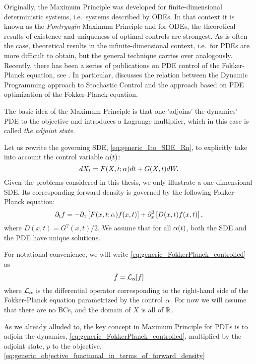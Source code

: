 Originally, the Maximum Principle was developed for finite-dimensional
deterministic systems, i.e.\ systems described by ODEs. In that context it is
known as the {\sl Pontryagin} Maximum Principle and for ODEs, the theoretical
results of existence and uniqueness of optimal controls are strongest. 
As is often the case, theoretical results in the infinite-dimensional context,
i.e.\ for PDEs are more difficult to obtain, but the general technique carries
over analogously. Recently, there has been a series of publications on PDE
control of the Fokker-Planck equation, see \cite{Annunziato2010,Annunziato2013,Annunziato2014}.
In particular, \cite{Annunziato2014} discusses the relation between the Dynamic
Programming approach to Stochastic Control and the approach based on PDE
optimization of the Fokker-Planck equation.

The basic idea of the Maximum Principle is that one 'adjoins' the dynamics' PDE
to the objective and introduces a Lagrange multiplier, which in this case is
called {\sl the adjoint state}.

Let us rewrite the governing SDE, \cref{eq:generic_Ito_SDE_Rn}, to explicitly
take into account the control variable $\alpha(t)$:
\begin{equation}
dX_t = F(X,t; \alpha) dt + G(X,t) dW.
\label{eq:generic_Ito_SDE_Rn_controlled}
\end{equation} 
Given the problems considered in this thesis, we only
illustrate  a one-dimensional SDE. Its corresponding forward density is
governed by the following Fokker-Planck equation: 
\begin{equation}
{\partial}_t {f}= -{\partial}_{x } \left[ F (x,t;\alpha) {f}(x,t) \right] +  
{\partial}^2_{x} \left[ D(x,t) {f}(x,t) \right],
\label{eq:generic_FokkerPlanck_controlled}
\end{equation} 
where $D(x,t) = G^2(x,t)/2$. We assume that for all $\alpha(t)$, both the SDE and the
PDE have unique solutions. 

For notational convenience, we will write
\cref{eq:generic_FokkerPlanck_controlled} as
$$ \dot{{f}} = { \mathcal{L} }_{\alpha} [{f}] $$ where ${ \mathcal{L} }_{\alpha}$ is the differential operator corresponding to the
right-hand side of the Fokker-Planck equation parametrized by the control $\alpha$.
For now we will assume that there are no BCs, and the domain of $X$ is all of ${ \mathbb{R} }$.

As we already alluded to, the key concept in Maximum Principle for PDEs is to
adjoin the dynamics, \cref{eq:generic_FokkerPlanck_controlled}, multiplied by
the adjoint state, $p$ to the objective,
\cref{eq:generic_objective_functional_in_terms_of_forward_density}
  
